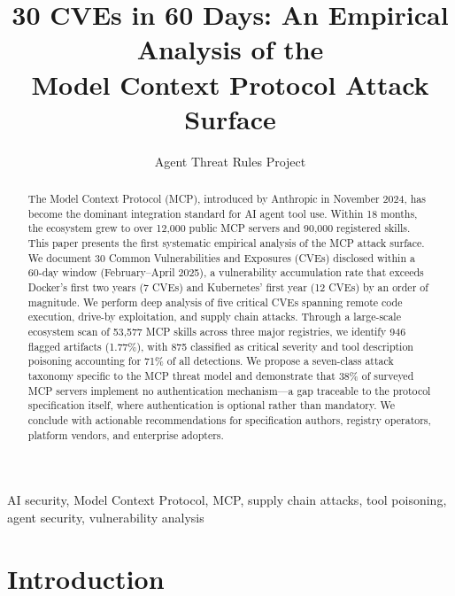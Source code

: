 \documentclass[11pt,twocolumn]{article}
\title{30 CVEs in 60 Days: An Empirical Analysis of the\\Model Context Protocol Attack Surface}
\author{
Agent Threat Rules Project}
\begin{document}
\maketitle

\begin{abstract}
The Model Context Protocol (MCP), introduced by Anthropic in November 2024, has become the dominant integration standard for AI agent tool use. Within 18 months, the ecosystem grew to over 12,000 public MCP servers and 90,000 registered skills. This paper presents the first systematic empirical analysis of the MCP attack surface. We document 30 Common Vulnerabilities and Exposures (CVEs) disclosed within a 60-day window (February--April 2025), a vulnerability accumulation rate that exceeds Docker's first two years (7 CVEs) and Kubernetes' first year (12 CVEs) by an order of magnitude. We perform deep analysis of five critical CVEs spanning remote code execution, drive-by exploitation, and supply chain attacks. Through a large-scale ecosystem scan of 53,577 MCP skills across three major registries, we identify 946 flagged artifacts (1.77\%), with 875 classified as critical severity and tool description poisoning accounting for 71\% of all detections. We propose a seven-class attack taxonomy specific to the MCP threat model and demonstrate that 38\% of surveyed MCP servers implement no authentication mechanism---a gap traceable to the protocol specification itself, where authentication is optional rather than mandatory. We conclude with actionable recommendations for specification authors, registry operators, platform vendors, and enterprise adopters.
\end{abstract}

\begin{IEEEkeywords}
AI security, Model Context Protocol, MCP, supply chain attacks, tool poisoning, agent security, vulnerability analysis
\end{IEEEkeywords}

\section{Introduction}
\label{sec:introduction}
\end{document}

